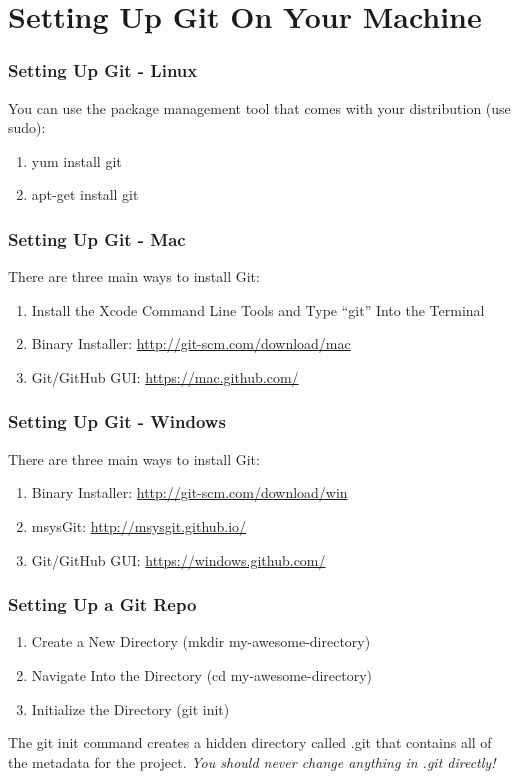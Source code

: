 
\section[Setting Up Git]{Setting Up Git On Your Machine}

\begin{frame}
\frametitle{\large{Setting Up Git - Linux}}
You can use the package management tool that comes with your distribution (use sudo):
\begin{enumerate}
\item yum install git
\item apt-get install git
\end{enumerate}
\end{frame}

\begin{frame}
\frametitle{\large{Setting Up Git - Mac}}
There are three main ways to install Git:
\begin{enumerate}
\item Install the Xcode Command Line Tools and Type ``git'' Into the Terminal
\item Binary Installer: \href{http://git-scm.com/download/mac}{http://git-scm.com/download/mac}
\item Git/GitHub GUI: \href{https://mac.github.com/}{https://mac.github.com/}
\end{enumerate}
\end{frame}

\begin{frame}
\frametitle{\large{Setting Up Git - Windows}}
There are three main ways to install Git:
\begin{enumerate}
\item Binary Installer: \href{http://git-scm.com/download/win}{http://git-scm.com/download/win}
\item msysGit: \href{http://msysgit.github.io/}{http://msysgit.github.io/}
\item Git/GitHub GUI: \href{https://windows.github.com/}{https://windows.github.com/}
\end{enumerate}
\end{frame}

\begin{frame}
\frametitle{\large{Setting Up a Git Repo}}
\begin{enumerate}
\item Create a New Directory (mkdir my-awesome-directory)
\item Navigate Into the Directory (cd my-awesome-directory)
\item Initialize the Directory (git init)
\end{enumerate}
\vspace{5mm}
The git init command creates a hidden directory called .git that contains all of the metadata for the project. \emph{You should never change anything in .git directly!}
\end{frame}
